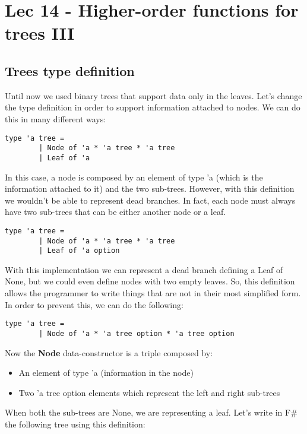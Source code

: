 \chapter{Lec 14 - Higher-order functions for trees III}

\section{Trees type definition}
Until now we used binary trees that support data only in the leaves. Let's change the type definition in order to support information attached to nodes. We can do this in many different ways:
\begin{lstlisting}[style = FSharpStyle]
    type 'a tree =
        | Node of 'a * 'a tree * 'a tree
        | Leaf of 'a
\end{lstlisting}
In this case, a node is composed by an element of type 'a (which is the information attached to it) and the two sub-trees. However, with this definition we wouldn't be able to represent dead branches. In fact, each node must always have two sub-trees that can be either another node or a leaf.
\begin{lstlisting}[style = FSharpStyle]
    type 'a tree =
        | Node of 'a * 'a tree * 'a tree
        | Leaf of 'a option
\end{lstlisting}
With this implementation we can represent a dead branch defining a Leaf of None, but we could even define nodes with two empty leaves. So, this definition allows the programmer to write things that are not in their most simplified form.\newline\newline
In order to prevent this, we can do the following:
\begin{lstlisting}[style = FSharpStyle]
    type 'a tree =
        | Node of 'a * 'a tree option * 'a tree option
\end{lstlisting}
Now the \textbf{Node} data-constructor is a triple composed by:
\begin{itemize}
    \item An element of type 'a (information in the node)
    \item Two 'a tree option elements which represent the left and right sub-trees
\end{itemize}
When both the sub-trees are None, we are representing a leaf.\newline\newline
Let's write in F\# the following tree using this definition:\newline
